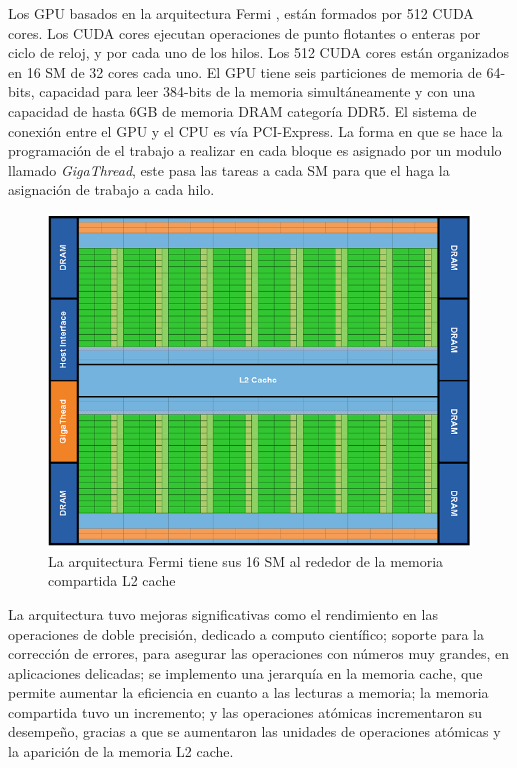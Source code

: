 Los GPU basados en la arquitectura Fermi \cite{fermi}, están formados por 512 CUDA cores. Los CUDA cores ejecutan operaciones de punto flotantes o enteras por ciclo de reloj, y por cada uno de los hilos. Los 512 CUDA cores están organizados en 16 SM de 32 cores cada uno. El GPU tiene seis particiones de memoria de 64-bits, capacidad para leer 384-bits de la memoria simultáneamente y con una capacidad de hasta 6GB de memoria DRAM categoría DDR5. El sistema de conexión entre el GPU y el CPU es vía PCI-Express. La forma en que se hace la programación de el trabajo a realizar en cada bloque es asignado por un modulo llamado \textit{GigaThread}, este pasa las tareas a cada SM para que el haga la asignación de trabajo a cada hilo. 

\begin{figure}[h]
			\centering
				\includegraphics[scale=0.7]{img/ArqFermi.png}
			\caption{La arquitectura Fermi tiene sus 16 SM al rededor de la memoria compartida L2 cache}
\end{figure}

La arquitectura tuvo mejoras significativas como el rendimiento en las operaciones de doble precisión, dedicado a computo científico; soporte para la corrección de errores, para asegurar las operaciones con números muy grandes, en aplicaciones delicadas; se implemento una jerarquía en la memoria cache, que permite aumentar la eficiencia en cuanto a las  lecturas a memoria; la memoria compartida tuvo un incremento; y las operaciones atómicas incrementaron su desempeño, gracias a que se aumentaron las unidades de operaciones atómicas y la aparición de la memoria L2 cache. 

